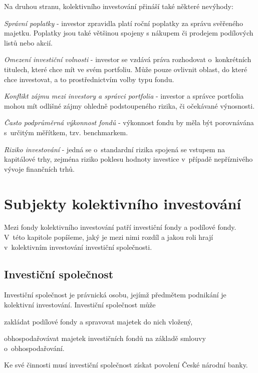 \documentclass[12pt,a4paper]{article}
\begin{document}
\medskip

\noindent
Na druhou stranu,  kolektivního investování přináší také některé nevýhody:
\begin{compactitem}
\item \emph{Správní poplatky} - investor zpravidla platí roční poplatky za správu svěřeného majetku. Poplatky jsou také většinou spojeny s nákupem či prodejem podílových listů nebo akcií.
\item \emph{Omezení investiční volnosti} - investor se vzdává práva rozhodovat o~konkrétních titulech, které chce mít ve svém portfoliu. Může pouze ovlivnit oblast, do které chce investovat, a to prostřednictvím volby typu fondu. 
\item \emph{Konflikt zájmu mezi investory a správci portfolia} - investor a správce portfolia mohou mít odlišné zájmy ohledně podstoupeného rizika, či očekávané výnosnosti.
\item \emph{Často podprůměrná výkonnost fondů} - výkonnost fondu by měla být porovnávána s~určitým měřítkem, tzv. benchmarkem.
\item \emph{Riziko investování} - jedná se o~standardní rizika spojená se vstupem na kapitálové trhy, zejména riziko poklesu hodnoty investice v~případě nepříznivého vývoje finančních trhů.
\end{compactitem}

\section{Subjekty kolektivního investování}
Mezi fondy kolektivního investování patří investiční fondy a podílové fondy. V~této kapitole popíšeme, jaký je mezi nimi rozdíl a jakou roli hrají v~kolektivním investování investiční společnosti.
 
\subsection{Investiční společnost}
Investiční společnost je právnická osobu, jejímž předmětem podnikání je kolektivní investování. Investiční společnost může
\begin{compactitem}
\item zakládat podílové fondy a spravovat majetek do nich vložený,
\item obhospodařovávat majetek investičních fondů na základě smlouvy o~obhospodařování.
\end{compactitem}
Ke své činnosti musí investiční společnost získat povolení České národní banky.
\end{document}

